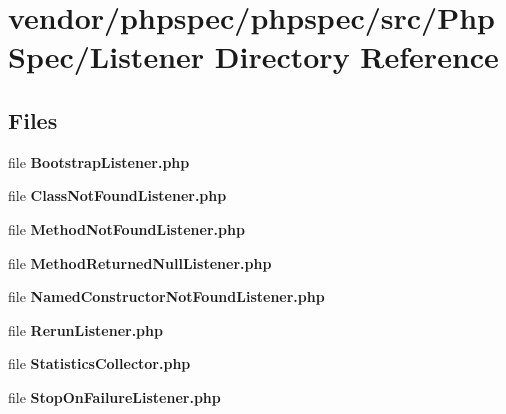 \section{vendor/phpspec/phpspec/src/\+Php\+Spec/\+Listener Directory Reference}
\label{dir_c37e543b93df24d150c898fe65f2c6a1}
\subsection*{Files}
\begin{DoxyCompactItemize}
\item 
file {\bf Bootstrap\+Listener.\+php}
\item 
file {\bf Class\+Not\+Found\+Listener.\+php}
\item 
file {\bf Method\+Not\+Found\+Listener.\+php}
\item 
file {\bf Method\+Returned\+Null\+Listener.\+php}
\item 
file {\bf Named\+Constructor\+Not\+Found\+Listener.\+php}
\item 
file {\bf Rerun\+Listener.\+php}
\item 
file {\bf Statistics\+Collector.\+php}
\item 
file {\bf Stop\+On\+Failure\+Listener.\+php}
\end{DoxyCompactItemize}
